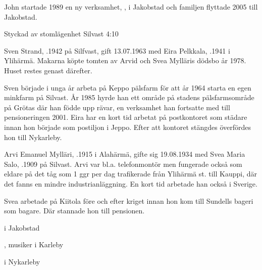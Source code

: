 John startade 1989 en ny verksamhet, , i Jakobstad och familjen flyttade 2005 till Jakobstad.



Styckad av stomlägenhet Silvast 4:10


Sven Strand, .1942 på Silfvast, gift 13.07.1963 med Eira Pelkkala, .1941 i Ylihärmä. Makarna köpte tomten av Arvid och Svea Mylläris dödsbo år 1978. Huset restes genast därefter.

Sven började i unga år arbeta på Keppo pälsfarm för att år 1964 starta en egen minkfarm på Silvast. År 1985 hyrde han ett område på stadens pälsfarmsområde på Grötas där han födde upp rävar, en verksamhet han fortsatte med till pensioneringen 2001. Eira har en kort tid arbetat på postkontoret som städare innan hon började som postiljon i Jeppo. Efter att kontoret stängdes överfördes hon till Nykarleby.
\begin{jhchildren}
  \item {}
  \item {}
\end{jhchildren}





Arvi Emanuel Mylläri, .1915 i Alahärmä, gifte sig 19.08.1934 med Svea Maria Salo, .1909 på Silvast. Arvi var bl.a. telefonmontör men fungerade också som eldare på det tåg som 1 ggr per dag trafikerade från Ylihärmä st. till Kauppi, där det fanns en mindre industrianläggning. En kort tid arbetade han också i Sverige.

Svea arbetade på Kiitola före och efter kriget innan hon kom till Sundells bageri som bagare. Där stannade hon till pensionen.
\begin{jhchildren}
  \item {} i Jakobstad
  \item {}, musiker i Karleby
  \item {} i Nykarleby
\end{jhchildren}


